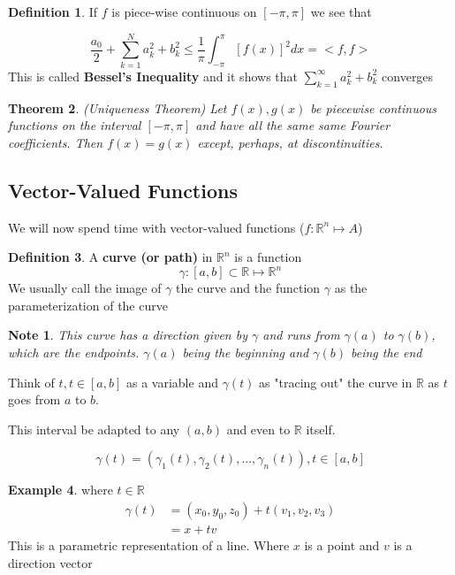 \documentclass[12pt]{article}
\theoremstyle{plain}
\newtheorem*{note}{Note}
\newtheorem{theorem}{Theorem}[section]
\theoremstyle{definition}
\newtheorem{definition}[theorem]{Definition}
\newtheorem{example}[theorem]{Example}
\begin{document}
\begin{definition}
	If $f$ is piece-wise continuous on $[-\pi, \pi]$ we see that

	$$\frac{a_0}{2}+ \sum^N_{k=1} a_k^2 + b_k^2 \leq \frac{1}{\pi} \int_{-\pi}^\pi [f(x)]^2 dx = <f,f>$$
	This is called \textbf{Bessel's Inequality} and it shows that $\sum^\infty_{k=1} a_k^2 + b_k^2$ converges
\end{definition}

\begin{theorem}
(Uniqueness Theorem) Let $f(x), g(x)$ be piecewise continuous functions on the interval $[-\pi,\pi]$ and have all the same same Fourier coefficients. Then $f(x)=g(x)$ except, perhaps, at discontinuities.
\end{theorem}

\subsection{Vector-Valued Functions}

We will now spend time with vector-valued functions ($f:\mathbb{R}^n \mapsto A$)

\begin{definition}
	A \textbf{curve (or path)} in $\mathbb{R}^n$ is a function
	$$\gamma : [a,b] \subset \mathbb{R} \mapsto \mathbb{R}^n$$
	We usually call the image of $\gamma$ the curve and the function $\gamma$ as the parameterization of the curve
\end{definition}

\begin{note}
	This curve has a direction given by $\gamma$ and runs from $\gamma (a)$ to $\gamma (b)$, which are the endpoints. $\gamma (a)$ being the beginning and $\gamma (b)$ being the end
\end{note}

Think of $t, t\in [a,b]$ as a variable and $\gamma (t)$ as "tracing out" the curve in $\mathbb{R}$ as $t$ goes from $a$ to $b$.

This interval be adapted to any $(a,b)$ and even to $\mathbb{R}$ itself.

$$\gamma (t) = (\gamma_1 (t), \gamma_2 (t), ..., \gamma_n (t)), t\in[a,b]$$

\begin{example}
	where $t \in \mathbb{R}$
	\begin{align*}
		\gamma (t) &= (x_0, y_0, z_0) + t(v_1,v_2,v_3)\\
		&= x + tv
	\end{align*}
	This is a parametric representation of a line. Where $x$ is a point and $v$ is a direction vector

\end{example}
\end{document}
